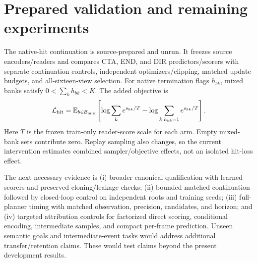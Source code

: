 \documentclass[10pt,twocolumn,letterpaper]{article}
\begin{document}
\section{Prepared validation and remaining experiments}
The native-hit continuation is source-prepared and unrun. It freezes source encoders/readers and compares CTA, END, and DIR predictors/scorers with separate continuation controls, independent optimizers/clipping, matched update budgets, and all-sixteen-view selection. For native termination flags $h_{bk}$, mixed banks satisfy $0<\sum_kh_{bk}<K$. The added objective is
\begin{equation}
\mathcal L_{\rm hit}=\mathbb{E}_{b\in\mathcal B_{\rm mix}}\left[
\log\sum_k e^{s_{bk}/T}-\log\sum_{k:h_{bk}=1}e^{s_{bk}/T}\right].
\end{equation}
Here $T$ is the frozen train-only reader-score scale for each arm. Empty mixed-bank sets contribute zero. Replay sampling also changes, so the current intervention estimates combined sampler/objective effects, not an isolated hit-loss effect. 

The next necessary evidence is (i) broader canonical qualification with learned scorers and preserved cloning/leakage checks; (ii) bounded matched continuation followed by closed-loop control on independent roots and training seeds; (iii) full-planner timing with matched observation, precision, candidates, and horizon; and (iv) targeted attribution controls for factorized direct scoring, conditional encoding, intermediate samples, and compact per-frame prediction. Unseen semantic goals and intermediate-event tasks would address additional transfer/retention claims. These would test claims beyond the present development results.
\end{document}
